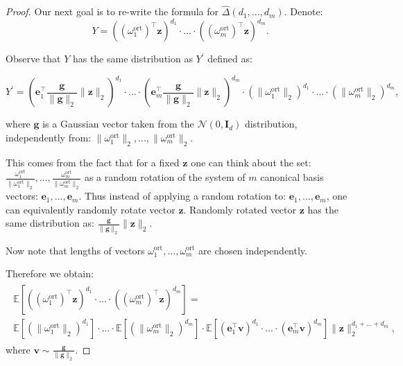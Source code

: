 \begin{proof}
Our next goal is to re-write the formula for $\widehat{\Delta}(d_{1},...,d_{m})$. Denote:
\begin{equation}
Y = ((\omega_{1}^{\mathrm{ort}})^{\top}\mathbf{z})^{d_{1}} \cdot ... \cdot ((\omega_{m}^{\mathrm{ort}})^{\top}\mathbf{z})^{d_{m}}.    
\end{equation}

Observe that $Y$ has the same distribution as $Y^{\prime}$ defined as:

\begin{equation}
Y^{\prime} = (\mathbf{e}_{1}^{\top}\frac{\mathbf{g}}{\|\mathbf{g}\|_{2}}\|\mathbf{z}\|_{2})^{d_{1}} \cdot ... \cdot (\mathbf{e}_{m}^{\top}\frac{\mathbf{g}}{\|\mathbf{g}\|_{2}}\|\mathbf{z}\|_{2})^{d_{m}} \cdot
(\|\omega_{1}^{\mathrm{ort}}\|_{2})^{d_{1}} \cdot ... \cdot
(\|\omega_{m}^{\mathrm{ort}}\|_{2})^{d_{m}},
\end{equation}

where $\mathbf{g}$ is a Gaussian vector taken from the $\mathcal{N}(0,\mathbf{I}_{d})$ distribution, independently from: $\|\omega_{1}^{\mathrm{ort}}\|_{2},...,\|\omega_{m}^{\mathrm{ort}}\|_{2}$. 

This comes from the fact that for a fixed $\mathbf{z}$ one can think about the set:
$\frac{\omega_{1}^{\mathrm{ort}}}{\|\omega_{1}^{\mathrm{ort}}\|_{2}},...,\frac{\omega_{m}^{\mathrm{ort}}}{\|\omega_{m}^{\mathrm{ort}}\|_{2}}$ as a random rotation of the system of $m$ canonical basis vectors: $\mathbf{e}_{1},...,\mathbf{e}_{m}$.
Thus instead of applying a random rotation to: $\mathbf{e}_{1},...,\mathbf{e}_{m}$, one can equivalently randomly rotate vector $\mathbf{z}$. Randomly rotated vector $\mathbf{z}$ has the same distribution as: $\frac{\mathbf{g}}{\|\mathbf{g}\|_{2}}\|\mathbf{z}\|_{2}$. 



Now note that lengths of vectors $\omega_{1}^{\mathrm{ort}},...,\omega_{m}^{\mathrm{ort}}$ are chosen independently.

Therefore we obtain:
\begin{align}
\begin{split}
\mathbb{E}[((\omega_{1}^{\mathrm{ort}})^{\top}\mathbf{z})^{d_{1}} \cdot ... \cdot ((\omega_{m}^{\mathrm{ort}})^{\top}\mathbf{z})^{d_{m}}] = \\ \mathbb{E}[(\|\omega_{1}^{\mathrm{ort}}\|_{2})^{d_{1}}] \cdot ... \cdot \mathbb{E}[(\|\omega_{m}^{\mathrm{ort}}\|_{2})^{d_{m}}] \cdot \mathbb{E}[(\mathbf{e}_{1}^{\top}\mathbf{v})^{d_{1}} \cdot ... \cdot (\mathbf{e}_{m}^{\top}\mathbf{v})^{d_{m}}]
\|\mathbf{z}\|_{2}^{d_{1}+...+d_{m}},
\end{split}
\end{align}
where $\mathbf{v} \sim \frac{\mathbf{g}}{\|\mathbf{g}\|_{2}}$.


\end{proof}
